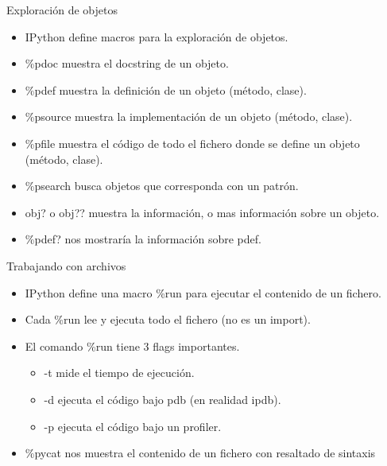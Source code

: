\documentclass[10pt]{beamer}
\begin{document}
  \begin{frame}{Exploración de objetos}
    \begin{itemize}
      \item IPython define macros para la exploración de objetos.
      \item \%pdoc muestra el docstring de un objeto.
      \item \%pdef muestra la definición de un objeto (método, clase).
      \item \%psource muestra la implementación de un objeto (método, clase).
      \item \%pfile muestra el código de todo el fichero donde se define un objeto (método, clase).
      \item \%psearch busca objetos que corresponda con un patrón.
      \item obj? o obj?? muestra la información, o mas información sobre un objeto.
      \item \%pdef? nos mostraría la información sobre pdef.
    \end{itemize}
  \end{frame}

  \begin{frame}{Trabajando con archivos}
    \begin{itemize}
      \item IPython define una macro \%run para ejecutar el contenido de un fichero.
      \item Cada \%run lee y ejecuta todo el fichero (no es un import).
      \item El comando \%run tiene 3 flags importantes.
      \begin{itemize}
        \item -t mide el tiempo de ejecución.
        \item -d ejecuta el código bajo pdb (en realidad ipdb).
        \item -p ejecuta el código bajo un profiler.
      \end{itemize}
      \item \%pycat nos muestra el contenido de un fichero con resaltado de sintaxis
    \end{itemize}
  \end{frame}
\end{document}
